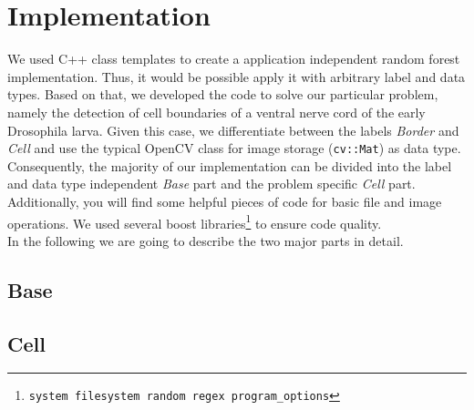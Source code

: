 \section{Implementation}
\label{sec:implementation}

We used C++ class templates to create a application independent random forest implementation. Thus, it would be possible apply it with arbitrary label and data types. Based on that, we developed the code to solve our particular problem, namely the detection of cell boundaries of a ventral nerve cord of the early Drosophila larva. Given this case, we differentiate between the labels \emph{Border} and \emph{Cell} and use the typical OpenCV class for image storage (\texttt{cv::Mat}) as data type.\\
Consequently, the majority of our implementation can be divided into the label and data type independent \emph{Base} part and the problem specific \emph{Cell} part. Additionally, you will find some helpful pieces of code for basic file and image operations. We used several boost libraries\footnote{\texttt{system filesystem random regex program\_options}} to ensure code quality.\\
In the following we are going to describe the two major parts in detail.

\subsection{Base}
\label{subsec:base}



\subsection{Cell}
\label{subsec:base}